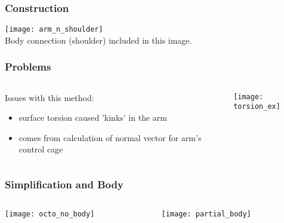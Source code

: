 \documentclass[14pt]{beamer}
\begin{document}
\begin{frame}
\frametitle{Construction}

\begin{center}
\texttt{[image: arm\_n\_shoulder]}\\
Body connection (shoulder) included in this image. 

\end{center}

\end{frame}

\begin{frame}
\frametitle{Problems}

\begin{columns}
\begin{column}{0.48\textwidth}
Issues with this method:
\begin{itemize}
\item surface torsion caused 'kinks' in the arm
\item comes from calculation of normal vector for arm's control cage
\end{itemize}
\end{column}

\hfill

\begin{column}{0.48\textwidth}

\begin{center}
\texttt{[image: torsion\_ex]}
\end{center}

\end{column}


\end{columns}

\end{frame}

\begin{frame}
\frametitle{Simplification and Body}


\begin{columns}
\begin{column}{0.48\textwidth}
\begin{center}
\texttt{[image: octo\_no\_body]}
\end{center}
\end{column}

\hfill

\begin{column}{0.48\textwidth}

\begin{center}
\texttt{[image: partial\_body]}
\end{center}

\end{column}


\end{columns}

\end{frame}
\end{document}
